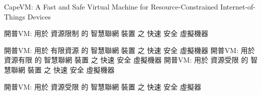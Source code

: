 

CapeVM: A Fast and Safe Virtual Machine for Resource-Constrained Internet-of-Things Devices


開普VM: 用於 資源限制 的 智慧聯網 裝置 之 快速 安全 虛擬機器

開普VM: 用於 有限資源 的 智慧聯網 裝置 之 快速 安全 虛擬機器
開普VM: 用於 資源有限 的 智慧聯網 裝置 之 快速 安全 虛擬機器
開普VM: 用於 資源受限 的 智慧聯網 裝置 之 快速 安全 虛擬機器



開普VM: 用於 資源受限 的 智慧聯網 裝置 之 快速 安全 虛擬器

